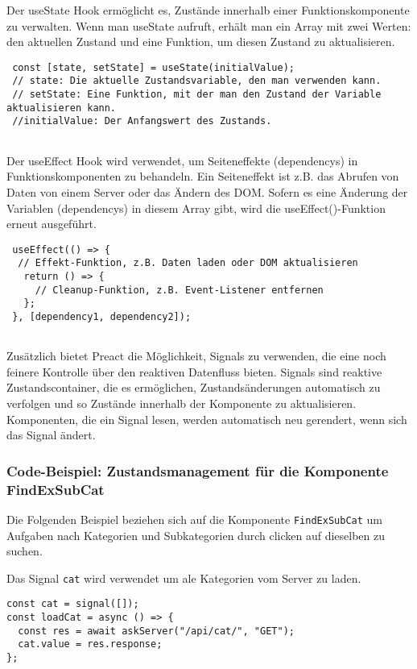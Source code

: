  Der useState Hook ermöglicht es, Zustände innerhalb einer Funktionskomponente zu verwalten. Wenn man useState aufruft, erhält man ein Array mit zwei Werten: den aktuellen Zustand und eine Funktion, um diesen Zustand zu aktualisieren.
 
 \begin{lstlisting}
 const [state, setState] = useState(initialValue);
 // state: Die aktuelle Zustandsvariable, den man verwenden kann.
 // setState: Eine Funktion, mit der man den Zustand der Variable aktualisieren kann.
 //initialValue: Der Anfangswert des Zustands.
 
 \end{lstlisting}
 
 
 Der useEffect Hook wird verwendet, um Seiteneffekte (dependencys) in Funktionskomponenten zu behandeln. Ein Seiteneffekt ist z.B. das Abrufen von Daten von einem Server oder das Ändern des DOM. Sofern es eine Änderung der Variablen (dependencys) in diesem Array gibt, wird die useEffect()-Funktion erneut ausgeführt.
 
 \begin{lstlisting}
 useEffect(() => {
  // Effekt-Funktion, z.B. Daten laden oder DOM aktualisieren
   return () => {
     // Cleanup-Funktion, z.B. Event-Listener entfernen
   };
 }, [dependency1, dependency2]);
 
 \end{lstlisting}
   
 
 
Zusätzlich bietet Preact die Möglichkeit, Signals zu verwenden, die eine noch feinere Kontrolle über den reaktiven Datenfluss bieten.
Signals sind reaktive Zustandscontainer, die es ermöglichen, Zustandsänderungen automatisch zu verfolgen und so Zustände innerhalb der Komponente zu aktualisieren. Komponenten, die ein Signal lesen, werden automatisch neu gerendert, wenn sich das Signal ändert.
 

\subsubsection{Code-Beispiel: Zustandsmanagement für die Komponente FindExSubCat } 
Die Folgenden Beispiel beziehen sich auf die Komponente \texttt{FindExSubCat} um Aufgaben nach Kategorien und Subkategorien durch clicken auf dieselben zu suchen.

Das Signal \texttt{cat} wird verwendet um ale Kategorien vom Server zu laden.

\begin{lstlisting}
const cat = signal([]);
const loadCat = async () => {
  const res = await askServer("/api/cat/", "GET");
  cat.value = res.response;
};

\end{lstlisting}


